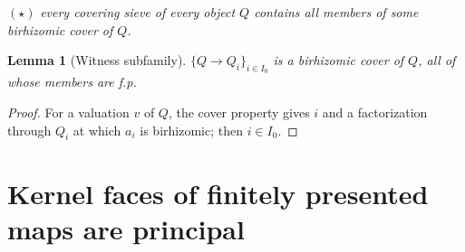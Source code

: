 \documentclass[11pt]{article}
\newtheorem{lemma}[theorem]{Lemma}
\theoremstyle{definition}
\theoremstyle{remark}
\begin{document}
\smallskip
$(\star)$ \emph{every covering sieve of every object $Q$ contains all members of some birhizomic cover of $Q$.}

\begin{lemma}[Witness subfamily]\label{lem:witness}
$\{Q\to Q_i\}_{i\in I_0}$ is a birhizomic cover of $Q$, all of whose members are f.p.
\end{lemma}
\begin{proof}
For a valuation $v$ of $Q$, the cover property gives $i$ and a factorization through $Q_i$ at which $a_i$ is birhizomic; then $i\in I_0$.
\end{proof}


\section{Kernel faces of finitely presented maps are principal}\label{sec:B}
\end{document}
